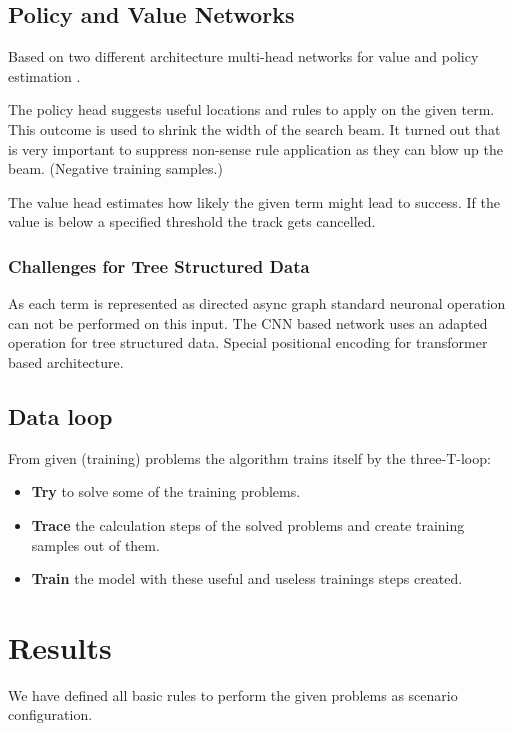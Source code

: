 \documentclass{scrartcl}
\begin{document}
\subsection{Policy and Value Networks}

Based on two different architecture multi-head networks for value and policy estimation \cite{44806}.

The policy head suggests useful locations and rules to apply on the given term. This outcome is used to shrink the width of the search beam.
It turned out that is very important to suppress non-sense rule application as they can blow up the beam. (Negative training samples.)

The value head estimates how likely the given term might lead to success. If the value is below a specified threshold the track gets cancelled.

\subsubsection{Challenges for Tree Structured Data}
As each term is represented as directed async graph standard neuronal operation can not be performed on this input.
The CNN based network uses an adapted operation for tree structured data.
Special positional encoding for transformer based architecture.

\subsection{Data loop}

From given (training) problems the algorithm trains itself by the three-T-loop: 

\begin{itemize}
	\item \textbf{Try} to solve some of the training problems.
	\item \textbf{Trace} the calculation steps of the solved problems and create training samples out of them.
	\item \textbf{Train} the model with these useful and useless trainings steps created.
\end{itemize}

\section{Results}
We have defined all basic rules to perform the given problems as scenario configuration.

\end{document}
